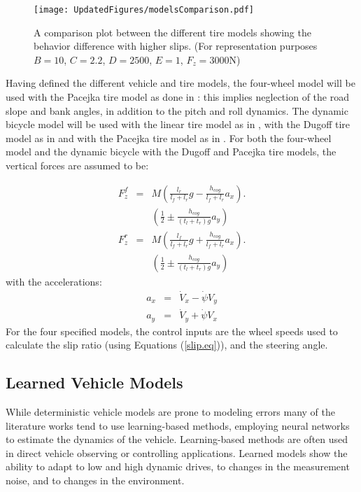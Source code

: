 \documentclass[journal]{IEEEtran}
\begin{document}
\begin{figure}
    \centering
    \texttt{[image: UpdatedFigures/modelsComparison.pdf]}
    \caption{A comparison plot between the different tire models showing the behavior difference with higher slips. (For representation purposes $B=10$, $C=2.2$, $D=2500$, $E=1$, $F_z=3000 \si{\newton}$)}
    \label{tireComp.fig}
\end{figure}

Having defined the different vehicle and tire models, the four-wheel model will be used with the Pacejka tire model as done in \mbox{\cite{katriniok_adaptive_2016}}: this implies neglection of the road slope and bank angles, in addition to the pitch and roll dynamics. The dynamic bicycle model will be used with the linear tire model as in \mbox{\cite{kiencke_observation_1997}}, with the Dugoff tire model as in \mbox{\cite{song_pneumatic_2014}} and with the Pacejka tire model as in \mbox{\cite{rucco_dynamics_2010}.} For both the four-wheel model and the dynamic bicycle with the Dugoff and Pacejka tire models, the vertical forces are assumed to be: 

\begin{subequations}\label{Fz.eq}
    \begin{eqnarray}
        F_z^f &=& M \left(\frac{l_r}{l_f+l_r}g-\frac{h_{cog}}{l_f+l_r}a_x\right). \nonumber\\ 
        && \left(\frac{1}{2}\pm \frac{h_{cog}}{(t_l+t_r)g}a_y\right) \\
        F_z^r &=& M \left(\frac{l_f}{l_f+l_r}g+\frac{h_{cog}}{l_f+l_r}a_x\right). \nonumber\\ 
        &&\left(\frac{1}{2}\pm \frac{h_{cog}}{(t_l+t_r)g}a_y\right) 
    \end{eqnarray}
\end{subequations}
with the accelerations:
\begin{subequations}\label{acc.eq}
    \begin{eqnarray}
        a_x &=& \dot V_x - \dot\psi V_y \\
        a_y &=& \dot V_y + \dot\psi V_x
    \end{eqnarray}    
\end{subequations}
For the four specified models, the control inputs are the wheel speeds used to calculate the slip ratio (using Equations (\mbox{\ref{slip.eq}})), and the steering angle.

\subsection{Learned Vehicle Models}
While deterministic vehicle models are prone to modeling errors many of the literature works tend to use learning-based methods, employing neural networks to estimate the dynamics of the vehicle. Learning-based methods are often used in direct vehicle observing \cite{ghosn_robust_2023, bou_ghosn_learning-based_2022, escoriza_data-driven_2021} or controlling \cite{spielberg_neural_2022, williams_information-theoretic_2018} applications. Learned models show the ability to adapt to low and high dynamic drives, to changes in the measurement noise, and to changes in the environment. 
\end{document}
